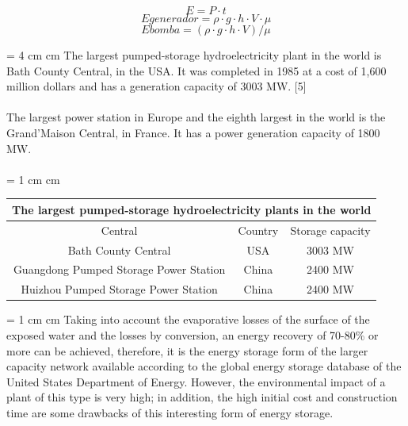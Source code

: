 \documentclass[a4paper,11 pt]{article}
\begin{document}
\begin {displaymath}
E= P\cdot t 
\end {displaymath}
\begin {displaymath}
Egenerador= \rho \cdot g \cdot h \cdot V \cdot \mu
\end {displaymath}
\begin {displaymath}
Ebomba= (\rho \cdot g \cdot h \cdot V)/ \mu
\end {displaymath}

\parskip= 4 cm
 cm
The largest pumped-storage hydroelectricity plant in the world is Bath County Central, in the USA. It was completed in 1985 at a cost of 1,600 million dollars and has a generation capacity of 3003 MW. [5]\\\\
The largest power station in Europe and the eighth largest in the world is the Grand'Maison Central, in France. It has a power generation capacity of 1800 MW. \cite{Lewis2017} \\ \\

\parskip= 1 cm
 cm
\begin{tabular}{|c||c||c|}
\hline \multicolumn {3}{|c|}{The largest pumped-storage hydroelectricity plants in the world}\\
\hline Central & Country & Storage capacity\\
\hline Bath County Central & USA & 3003 MW\\
\hline Guangdong Pumped Storage Power Station & China & 2400 MW\\
\hline Huizhou Pumped Storage Power Station &	China & 2400 MW\\
\hline
\end {tabular}

\parskip= 1 cm
 cm
Taking into account the evaporative losses of the surface of the exposed water and the losses by conversion, an energy recovery of 70-80\% or more can be achieved, therefore, it is the energy storage form of the larger capacity network available according to the global energy storage database of the United States Department of Energy. However, the environmental impact of a plant of this type is very high; in addition, the high initial cost and construction time are some drawbacks of this interesting form of energy storage. \cite{Boysen2018} \\\\



\end{document}
